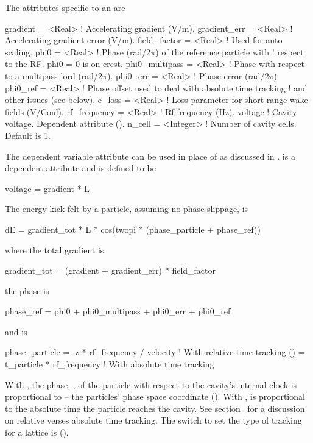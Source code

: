 The attributes specific to an  are 
\begin{example}
  gradient       = <Real>    ! Accelerating gradient (V/m).
  gradient_err   = <Real>    ! Accelerating gradient error (V/m).
  field_factor   = <Real>    ! Used for auto scaling.
  phi0           = <Real>    ! Phase (rad/2\(\pi\)) of the reference particle with 
                             !   respect to the RF. phi0 = 0 is on crest.
  phi0_multipass = <Real>    ! Phase with respect to a multipass lord (rad/2\(\pi\)).
  phi0_err       = <Real>    ! Phase error (rad/2\(\pi\))
  phi0_ref       = <Real>    ! Phase offset used to deal with absolute time tracking
                             !  and other issues (see below).
  e_loss         = <Real>    ! Loss parameter for short range wake fields (V/Coul).
  rf_frequency   = <Real>    ! Rf frequency (Hz).
  voltage                    ! Cavity voltage. Dependent attribute ().
  n_cell         = <Integer> ! Number of cavity cells. Default is 1.
\end{example}
The dependent variable  attribute can be used in place of
 as discussed in .   is a
dependent attribute and is defined to be
\begin{example}
  voltage = gradient * L
\end{example}

The energy kick felt by a particle, assuming no phase slippage, is 
\begin{example}
  dE = gradient_tot * L * cos(twopi * (phase_particle + phase_ref))
\end{example}
where the total gradient is
\begin{example}
  gradient_tot = (gradient + gradient_err) * field_factor
\end{example}
the phase  is
\begin{example}
  phase_ref = phi0 + phi0_multipass + phi0_err + phi0_ref
\end{example}
and  is
\begin{example}
  phase_particle = -z * rf_frequency / velocity  ! With relative time tracking ()
                 =  t_particle * rf_frequency    ! With absolute time tracking
\end{example}
With , the phase, , of the
particle with respect to the cavity's internal clock is proportional
to  -- the particles' phase space coordinate
(). With ,
 is proportional to the absolute time the particle
reaches the cavity. See section~ for a discussion on
relative verses absolute time tracking. The switch to set the type of
tracking for a lattice is 
().

